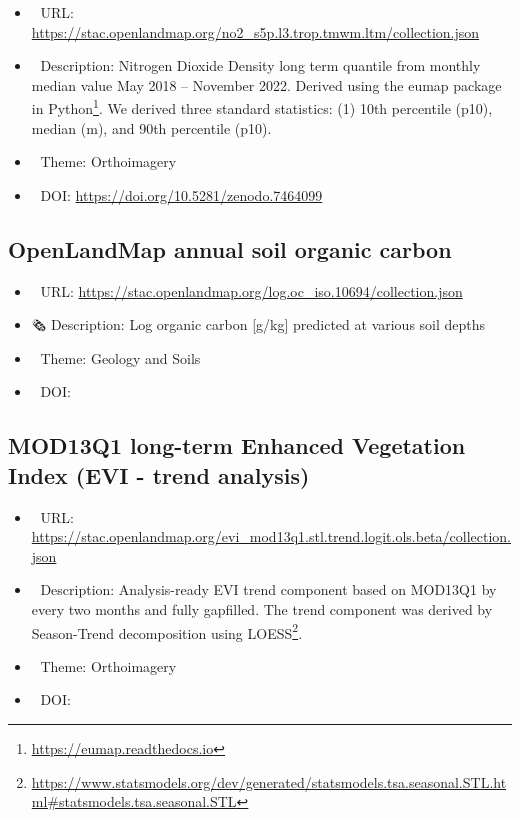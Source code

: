 \documentclass[
  graybox,natbib,nospthms]{svmono}
\providecommand{\tightlist}{%
  \setlength{\itemsep}{0pt}\setlength{\parskip}{0pt}}
\providecommand{\tightlist}{\setlength{\itemsep}{0pt}\setlength{\parskip}{0pt}}
\renewcommand{\href}[2]{#2 (\url{#1})}
\renewcommand{\href}[2]{#2\footnote{\url{#1}}}
\begin{document}
\begin{itemize}
\tightlist
\item
  🔗 URL: \url{https://stac.openlandmap.org/no2_s5p.l3.trop.tmwm.ltm/collection.json}
\item
  📰 Description: Nitrogen Dioxide Density long term quantile from monthly median value May 2018 -- November 2022. Derived using the \href{https://eumap.readthedocs.io}{eumap package in Python}. We derived three standard statistics: (1) 10th percentile (p10), median (m), and 90th percentile (p10).
\item
  📝 Theme: Orthoimagery
\item
  📂 DOI: \url{https://doi.org/10.5281/zenodo.7464099}
\end{itemize}

\hypertarget{openlandmap-annual-soil-organic-carbon}{%
\subsection{OpenLandMap annual soil organic carbon}\label{openlandmap-annual-soil-organic-carbon}}

\begin{itemize}
\tightlist
\item
  🔗 URL: \url{https://stac.openlandmap.org/log.oc_iso.10694/collection.json}
\item
  🗞 Description: Log organic carbon {[}g/kg{]} predicted at various soil depths
\item
  📝 Theme: Geology and Soils
\item
  📂 DOI:
\end{itemize}

\hypertarget{mod13q1-long-term-enhanced-vegetation-index-evi---trend-analysis}{%
\subsection{MOD13Q1 long-term Enhanced Vegetation Index (EVI - trend analysis)}\label{mod13q1-long-term-enhanced-vegetation-index-evi---trend-analysis}}

\begin{itemize}
\tightlist
\item
  🔗 URL: \url{https://stac.openlandmap.org/evi_mod13q1.stl.trend.logit.ols.beta/collection.json}
\item
  📰 Description: Analysis-ready EVI trend component based on MOD13Q1 by every two months and fully gapfilled. The trend component was derived by \href{https://www.statsmodels.org/dev/generated/statsmodels.tsa.seasonal.STL.html\#statsmodels.tsa.seasonal.STL}{Season-Trend decomposition using LOESS}.
\item
  📝 Theme: Orthoimagery
\item
  📂 DOI:
\end{itemize}
\end{document}
